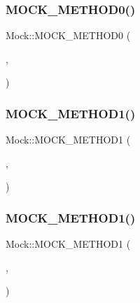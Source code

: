 \mbox{\label{class_mock_ae710f23cafb1a2f17772e8805d6312d2}} 
\subsubsection{\texorpdfstring{MOCK\_METHOD0()}{MOCK\_METHOD0()}\hspace{0.1cm}{\footnotesize\ttfamily [3/3]}}
{\footnotesize\ttfamily Mock\+::\+M\+O\+C\+K\+\_\+\+M\+E\+T\+H\+O\+D0 (\begin{DoxyParamCaption}\item[{Do\+This}]{,  }\item[{void()}]{ }\end{DoxyParamCaption})}

\mbox{\label{class_mock_ada59eea6991953353f332e3ea1e74444}} 
\subsubsection{\texorpdfstring{MOCK\_METHOD1()}{MOCK\_METHOD1()}\hspace{0.1cm}{\footnotesize\ttfamily [1/27]}}
{\footnotesize\ttfamily Mock\+::\+M\+O\+C\+K\+\_\+\+M\+E\+T\+H\+O\+D1 (\begin{DoxyParamCaption}\item[{\mbox{\hyperlink{class_interface_a65d6ae604e7e9a513aec72c9c94e0b97}{Void\+From\+String}}}]{,  }\item[{void(char $\ast$str)}]{ }\end{DoxyParamCaption})}

\mbox{\label{class_mock_ada59eea6991953353f332e3ea1e74444}} 
\subsubsection{\texorpdfstring{MOCK\_METHOD1()}{MOCK\_METHOD1()}\hspace{0.1cm}{\footnotesize\ttfamily [2/27]}}
{\footnotesize\ttfamily Mock\+::\+M\+O\+C\+K\+\_\+\+M\+E\+T\+H\+O\+D1 (\begin{DoxyParamCaption}\item[{\mbox{\hyperlink{class_interface_a65d6ae604e7e9a513aec72c9c94e0b97}{Void\+From\+String}}}]{,  }\item[{void(char $\ast$str)}]{ }\end{DoxyParamCaption})}

